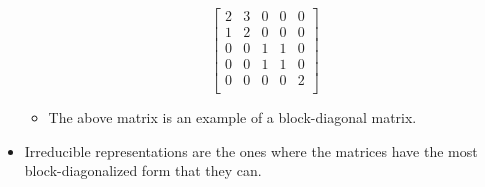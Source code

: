 \documentclass[../notes.tex]{subfiles}
\begin{document}
\begin{itemize}
    \begin{equation*}
        \begin{bmatrix}
            2 & 3 & 0 & 0 & 0\\
            1 & 2 & 0 & 0 & 0\\
            0 & 0 & 1 & 1 & 0\\
            0 & 0 & 1 & 1 & 0\\
            0 & 0 & 0 & 0 & 2\\
        \end{bmatrix}
    \end{equation*}
    \begin{itemize}
        \item The above matrix is an example of a block-diagonal matrix.
    \end{itemize}
    \item Irreducible representations are the ones where the matrices have the most block-diagonalized form that they can.
\end{itemize}
\end{document}
